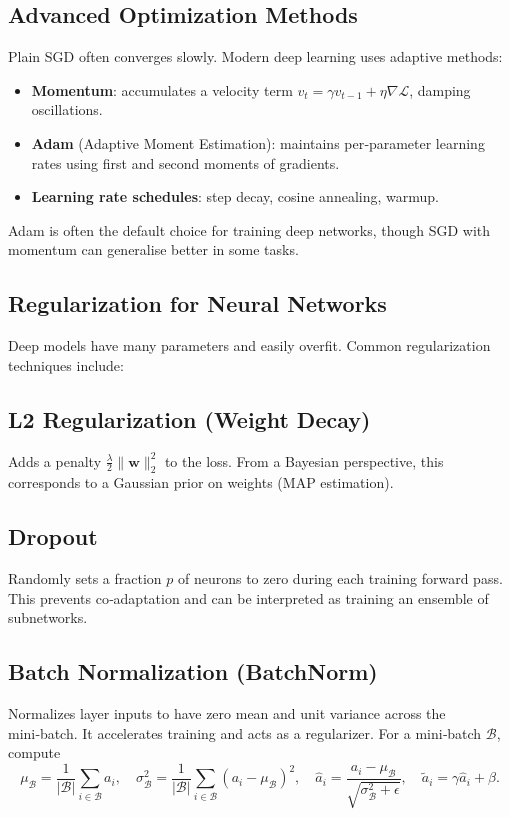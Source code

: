 \documentclass{tufte-handout}
\let\subsubsection\subsection
\begin{document}
\subsection{Advanced Optimization Methods}

Plain SGD often converges slowly. Modern deep learning uses adaptive methods:

\begin{itemize}
    \item \textbf{Momentum}: accumulates a velocity term $v_t = \gamma v_{t-1} + \eta \nabla \mathcal{L}$, damping oscillations.
    \item \textbf{Adam} (Adaptive Moment Estimation): maintains per‑parameter learning rates using first and second moments of gradients.
    \item \textbf{Learning rate schedules}: step decay, cosine annealing, warmup.
\end{itemize}

\begin{remark}
    Adam is often the default choice for training deep networks, though SGD with momentum can generalise better in some tasks.
\end{remark}

\subsection{Regularization for Neural Networks}

Deep models have many parameters and easily overfit. Common regularization techniques include:

\subsubsection{L2 Regularization (Weight Decay)}
Adds a penalty $\frac{\lambda}{2}\|\mathbf{w}\|_2^2$ to the loss. From a Bayesian perspective, this corresponds to a Gaussian prior on weights (MAP estimation).

\subsubsection{Dropout}
Randomly sets a fraction $p$ of neurons to zero during each training forward pass. This prevents co‑adaptation and can be interpreted as training an ensemble of subnetworks.

\subsubsection{Batch Normalization (BatchNorm)}
Normalizes layer inputs to have zero mean and unit variance across the mini‑batch. It accelerates training and acts as a regularizer. For a mini‑batch $\mathcal{B}$, compute
\[
\mu_{\mathcal{B}} = \frac{1}{|\mathcal{B}|}\sum_{i\in\mathcal{B}} a_i,\quad \sigma_{\mathcal{B}}^2 = \frac{1}{|\mathcal{B}|}\sum_{i\in\mathcal{B}} (a_i-\mu_{\mathcal{B}})^2,\quad \hat{a}_i = \frac{a_i-\mu_{\mathcal{B}}}{\sqrt{\sigma_{\mathcal{B}}^2+\epsilon}},\quad \tilde{a}_i = \gamma \hat{a}_i + \beta.
\]
\end{document}
